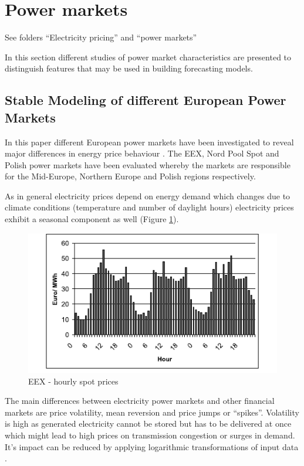 
\section{Power markets}

See folders "`Electricity pricing"' and "`power markets"'

In this section different studies of power market characteristics are presented to distinguish features that may be used in building forecasting models. 

\subsection{Stable Modeling of different European Power Markets}

In this paper different European power markets have been investigated to reveal major differences in energy price behaviour \cite{mugele2005stable}. The EEX, Nord Pool Spot and Polish power markets have been evaluated whereby the markets are responsible for the Mid-Europe, Northern Europe and Polish regions respectively. 

As in general electricity prices depend on energy demand \cite{weron2005forecasting} which changes due to climate conditions (temperature and number of daylight hours) electricity prices exhibit a seasonal component as well (Figure \ref{fig:seasonal_behaviour_of_eex_prices}). 

\begin{figure}[htbp]
	\centering
		\includegraphics{figures/state_of_the_art/seasonal_behaviour_of_eex_prices.PNG}
	\caption{EEX - hourly spot prices \cite{mugele2005stable}}
	\label{fig:seasonal_behaviour_of_eex_prices}
\end{figure}

The main differences between electricity power markets and other financial markets are price volatility, mean reversion and price jumps or "`spikes"'. Volatility is high as generated electricity cannot be stored but has to be delivered at once which might lead to high prices on transmission congestion or surges in demand. It's impact can be reduced by applying logarithmic transformations of input data \cite{weron2005forecasting}. 

